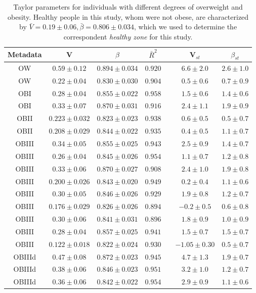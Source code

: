 \begin{table} 
  \begin{center}
    \begin{tabular}{ccccccc}
	    \hline
		Metadata&V&$\beta$&$\bar{R}^2$&&V$_{st}$&$\beta_{st}$\\
		\hline
		OW&$0.59 \pm 0.12$&$0.894 \pm 0.034$&$0.920$&&$6.6 \pm 2.0$&$2.6 \pm 1.0$\\
		OW&$0.22 \pm 0.04$&$0.830 \pm 0.030$&$0.904$&&$0.5 \pm 0.6$&$0.7 \pm 0.9$\\
		\hline
		OBI&$0.28 \pm 0.04$&$0.855 \pm 0.022$&$0.958$&&$1.5 \pm 0.6$&$1.4 \pm 0.6$\\
		OBI&$0.33 \pm 0.07$&$0.870 \pm 0.031$&$0.916$&&$2.4 \pm 1.1$&$1.9 \pm 0.9$\\
		\hline
		OBII&$0.223 \pm 0.032$&$0.823 \pm 0.023$&$0.938$&&$0.6 \pm 0.5$&$0.5 \pm 0.7$\\
		OBII&$0.208 \pm 0.029$&$0.844 \pm 0.022$&$0.935$&&$0.4 \pm 0.5$&$1.1 \pm 0.7$\\
		\hline
		OBIII&$0.34 \pm 0.05$&$0.855 \pm 0.025$&$0.943$&&$2.5 \pm 0.9$&$1.4 \pm 0.7$\\
		OBIII&$0.26 \pm 0.04$&$0.845 \pm 0.026$&$0.954$&&$1.1 \pm 0.7$&$1.2 \pm 0.8$\\
		OBIII&$0.33 \pm 0.06$&$0.870 \pm 0.027$&$0.908$&&$2.4 \pm 1.0$&$1.9 \pm 0.8$\\
		OBIII&$0.200 \pm 0.026$&$0.843 \pm 0.020$&$0.949$&&$0.2 \pm 0.4$&$1.1 \pm 0.6$\\
		OBIII&$0.30 \pm 0.05$&$0.846 \pm 0.026$&$0.929$&&$1.9 \pm 0.8$&$1.2 \pm 0.7$\\
		OBIII&$0.176 \pm 0.029$&$0.826 \pm 0.026$&$0.894$&&$-0.2 \pm 0.5$&$0.6 \pm 0.8$\\
		OBIII&$0.30 \pm 0.06$&$0.841 \pm 0.031$&$0.896$&&$1.8 \pm 0.9$&$1.0 \pm 0.9$\\
		OBIII&$0.28 \pm 0.04$&$0.857 \pm 0.025$&$0.941$&&$1.5 \pm 0.7$&$1.5 \pm 0.7$\\
		OBIII&$0.122 \pm 0.018$&$0.822 \pm 0.024$&$0.930$&&$-1.05 \pm 0.30$&$0.5 \pm 0.7$\\
		\hline
		OBIIId&$0.47 \pm 0.08$&$0.872 \pm 0.023$&$0.945$&&$4.7 \pm 1.3$&$1.9 \pm 0.7$\\
		OBIIId&$0.38 \pm 0.06$&$0.846 \pm 0.023$&$0.951$&&$3.2 \pm 1.0$&$1.2 \pm 0.7$\\
		OBIIId&$0.36 \pm 0.06$&$0.842 \pm 0.022$&$0.954$&&$2.9 \pm 0.9$&$1.1 \pm 0.6$\\
	    \hline
	    \hline
    \end{tabular}
  \end{center}
  \caption{Taylor parameters for individuals with different degrees of overweight and obesity\cite{LEA}. Healthy people in this study, whom were not obese, are characterized by $\bar{V} = 0.19 \pm 0.06, \bar{\beta} = 0.806 \pm 0.034$, which we used to determine the correspondent \emph{healthy zone} for this study.}
  \label{tab:LEA}
\end{table}

